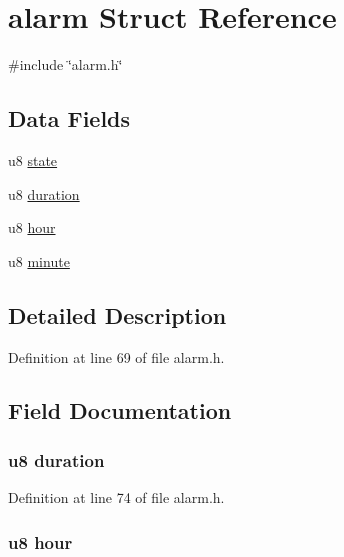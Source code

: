 \hypertarget{structalarm}{\section{alarm \-Struct \-Reference}
\label{structalarm}
}


{\ttfamily \#include \char`\"{}alarm.\-h\char`\"{}}

\subsection*{\-Data \-Fields}
\begin{DoxyCompactItemize}
\item 
u8 \hyperlink{structalarm_ad0bc4e4e6e6ffc52d9079b73afd73887}{state}
\item 
u8 \hyperlink{structalarm_a7cf817ed3a4c1da67ebdc89642aa835a}{duration}
\item 
u8 \hyperlink{structalarm_aee425ac71759c167362d22f272d89804}{hour}
\item 
u8 \hyperlink{structalarm_ae0a353dafc35c2935794f93a4e473a19}{minute}
\end{DoxyCompactItemize}


\subsection{\-Detailed \-Description}


\-Definition at line 69 of file alarm.\-h.



\subsection{\-Field \-Documentation}
\hypertarget{structalarm_a7cf817ed3a4c1da67ebdc89642aa835a}{
\subsubsection[{duration}]{\setlength{\rightskip}{0pt plus 5cm}u8 {\bf duration}}}\label{structalarm_a7cf817ed3a4c1da67ebdc89642aa835a}


\-Definition at line 74 of file alarm.\-h.

\hypertarget{structalarm_aee425ac71759c167362d22f272d89804}{
\subsubsection[{hour}]{\setlength{\rightskip}{0pt plus 5cm}u8 {\bf hour}}}\label{structalarm_aee425ac71759c167362d22f272d89804}


